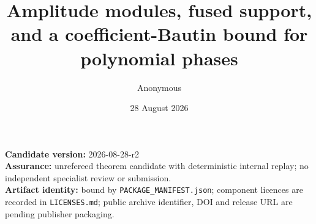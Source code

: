 \documentclass[
  11pt,
  a4paper,
]{amsart}
\title{Amplitude modules, fused support, and a coefficient-Bautin bound
for polynomial phases}
\author{Anonymous}
\date{28 August 2026}
\begin{document}
\maketitle

\begin{center}\small \textbf{Candidate version:} 2026-08-28-r2\\ \textbf{Assurance:} unrefereed theorem candidate with deterministic internal replay; no independent specialist review or submission.\\ \textbf{Artifact identity:} bound by \texttt{PACKAGE\_MANIFEST.json}; component licences are recorded in \texttt{LICENSES.md}; public archive identifier, DOI and release URL are pending publisher packaging.\end{center}

\begin{abstract}


\end{abstract}
\end{document}
